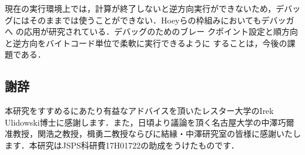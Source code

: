 \documentclass[submit,PRO]{ipsj}
\begin{document}
現在の実行環境上では，計算が終了しないと逆方向実行ができないため，デバッ
グにはそのままでは使うことができない．Hoeyらの枠組みにおいてもデバッガへ
の応用が研究されている\cite{DBLP:conf/rc/HoeyU19}．デバッグのためのブレー
クポイント設定と順方向と逆方向をバイトコード単位で柔軟に実行できるように
することは，今後の課題である．

\subsection*{謝辞}

本研究をすすめるにあたり有益なアドバイスを頂いたレスター大学のIrek
Ulidowski博士に感謝します．また，日頃より議論を頂く名古屋大学の中澤巧爾
准教授，関浩之教授，楫勇二教授ならびに結縁・中澤研究室の皆様に感謝いたし
ます．本研究はJSPS科研費17H01722の助成をうけたものです．



\end{document}
